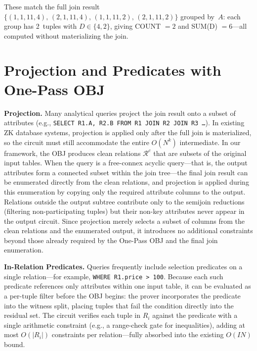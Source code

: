 \documentclass[sigconf]{acmart}
\begin{document}
\begin{example}
\noindent These match the full join result $\{(1,1,11,4),\,(2,1,11,4),\,(1,1,11,2),\,(2,1,11,2)\}$ grouped by~$A$: each group has 2~tuples with $D \in \{4,2\}$, giving COUNT $= 2$ and SUM(D) $= 6$---all computed without materializing the join.
\end{example}


\section{Projection and Predicates with One-Pass OBJ}
\label{app:projection_predicates}

\noindent\textbf{Projection.}
Many analytical queries project the join result onto a subset of attributes (e.g., \texttt{SELECT R1.A, R2.B FROM R1 JOIN R2 JOIN R3 \ldots}). In existing ZK database systems, projection is applied only after the full join is materialized, so the circuit must still accommodate the entire $O(N^k)$ intermediate. In our framework, the OBJ produces clean relations $\mathcal{R}^c$ that are subsets of the original input tables. When the query is a free-connex acyclic query---that is, the output attributes form a connected subset within the join tree---the final join result can be enumerated directly from the clean relations, and projection is applied during this enumeration by copying only the required attribute columns to the output. Relations outside the output subtree contribute only to the semijoin reductions (filtering non-participating tuples) but their non-key attributes never appear in the output circuit. Since projection merely selects a subset of columns from the clean relations and the enumerated output, it introduces no additional constraints beyond those already required by the One-Pass OBJ and the final join enumeration.

\noindent\textbf{In-Relation Predicates.}
Queries frequently include selection predicates on a single relation---for example, \texttt{WHERE R1.price > 100}. Because each such predicate references only attributes within one input table, it can be evaluated as a per-tuple filter before the OBJ begins: the prover incorporates the predicate into the witness split, placing tuples that fail the condition directly into the residual set. The circuit verifies each tuple in $R_i$ against the predicate with a single arithmetic constraint (e.g., a range-check gate for inequalities), adding at most $O(|R_i|)$ constraints per relation---fully absorbed into the existing $O(\mathit{IN})$ bound.
\end{document}
